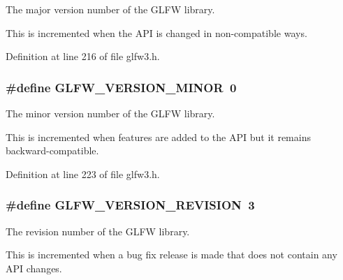 The major version number of the G\-L\-F\-W library. 

This is incremented when the A\-P\-I is changed in non-\/compatible ways. 

Definition at line 216 of file glfw3.\-h.

\hypertarget{group__init_gaf80d40f0aea7088ff337606e9c48f7a3}{
\subsubsection[{G\-L\-F\-W\-\_\-\-V\-E\-R\-S\-I\-O\-N\-\_\-\-M\-I\-N\-O\-R}]{\setlength{\rightskip}{0pt plus 5cm}\#define G\-L\-F\-W\-\_\-\-V\-E\-R\-S\-I\-O\-N\-\_\-\-M\-I\-N\-O\-R~0}}\label{group__init_gaf80d40f0aea7088ff337606e9c48f7a3}


The minor version number of the G\-L\-F\-W library. 

This is incremented when features are added to the A\-P\-I but it remains backward-\/compatible. 

Definition at line 223 of file glfw3.\-h.

\hypertarget{group__init_gab72ae2e2035d9ea461abc3495eac0502}{
\subsubsection[{G\-L\-F\-W\-\_\-\-V\-E\-R\-S\-I\-O\-N\-\_\-\-R\-E\-V\-I\-S\-I\-O\-N}]{\setlength{\rightskip}{0pt plus 5cm}\#define G\-L\-F\-W\-\_\-\-V\-E\-R\-S\-I\-O\-N\-\_\-\-R\-E\-V\-I\-S\-I\-O\-N~3}}\label{group__init_gab72ae2e2035d9ea461abc3495eac0502}


The revision number of the G\-L\-F\-W library. 

This is incremented when a bug fix release is made that does not contain any A\-P\-I changes. 

